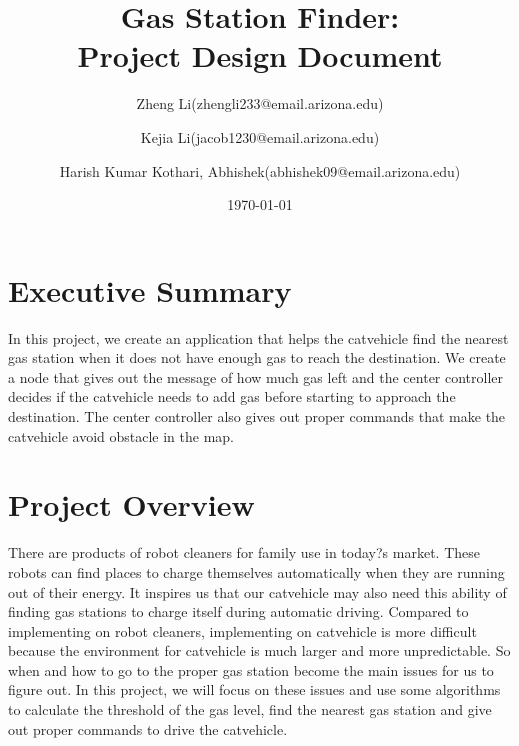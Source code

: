 \documentclass[12pt,onecolumn,titlepage]{article}
\begin{document}
\title{Gas Station Finder:\\Project Design Document}


\author[au1]{Zheng Li(zhengli233@email.arizona.edu)} 
\author[au2]{Kejia Li(jacob1230@email.arizona.edu)} 
\author[au3]{Harish Kumar Kothari, Abhishek(abhishek09@email.arizona.edu)}
		



\date{\today}

\maketitle



\section{Executive Summary }
In this project, we create an application that helps the catvehicle find the nearest gas station when it does not have enough gas to reach the destination. We create a node that gives out the message of how much gas left and the center controller decides if the catvehicle needs to add gas before starting to approach the destination. The center controller also gives out proper commands that make the catvehicle avoid obstacle in the map.

\section{Project Overview}
There are products of robot cleaners for family use in today?s market. These robots can find places to charge themselves automatically when they are running out of their energy. It inspires us that our catvehicle may also need this ability of finding gas stations to charge itself during automatic driving. Compared to implementing on robot cleaners, implementing on catvehicle is more difficult because the environment for catvehicle is much larger and more unpredictable. So when and how to go to the proper gas station become the main issues for us to figure out. In this project, we will focus on these issues and use some algorithms to calculate the threshold of the gas level, find the nearest gas station and give out proper commands to drive the catvehicle. 
\end{document}

